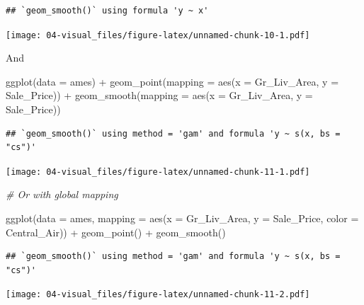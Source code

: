 \documentclass[
]{book}
\newenvironment{Shaded}{\begin{snugshade}}{\end{snugshade}}
\newcommand{\AttributeTok}[1]{\textcolor[rgb]{0.77,0.63,0.00}{#1}}
\newcommand{\CommentTok}[1]{\textcolor[rgb]{0.56,0.35,0.01}{\textit{#1}}}
\newcommand{\FunctionTok}[1]{\textcolor[rgb]{0.00,0.00,0.00}{#1}}
\newcommand{\NormalTok}[1]{#1}
\newcommand{\SpecialCharTok}[1]{\textcolor[rgb]{0.00,0.00,0.00}{#1}}
\begin{document}
\begin{verbatim}
## `geom_smooth()` using formula 'y ~ x'
\end{verbatim}

\texttt{[image: 04-visual\_files/figure-latex/unnamed-chunk-10-1.pdf]}

And

\begin{Shaded}
\begin{Highlighting}[]
\FunctionTok{ggplot}\NormalTok{(}\AttributeTok{data =}\NormalTok{ ames) }\SpecialCharTok{+} 
  \FunctionTok{geom\_point}\NormalTok{(}\AttributeTok{mapping =} \FunctionTok{aes}\NormalTok{(}\AttributeTok{x =}\NormalTok{ Gr\_Liv\_Area, }
                           \AttributeTok{y =}\NormalTok{ Sale\_Price)) }\SpecialCharTok{+}
  \FunctionTok{geom\_smooth}\NormalTok{(}\AttributeTok{mapping =} \FunctionTok{aes}\NormalTok{(}\AttributeTok{x =}\NormalTok{ Gr\_Liv\_Area, }
                           \AttributeTok{y =}\NormalTok{ Sale\_Price)) }
\end{Highlighting}
\end{Shaded}

\begin{verbatim}
## `geom_smooth()` using method = 'gam' and formula 'y ~ s(x, bs = "cs")'
\end{verbatim}

\texttt{[image: 04-visual\_files/figure-latex/unnamed-chunk-11-1.pdf]}

\begin{Shaded}
\begin{Highlighting}[]
\CommentTok{\# Or with global mapping}

\FunctionTok{ggplot}\NormalTok{(}\AttributeTok{data =}\NormalTok{ ames, }
       \AttributeTok{mapping =} \FunctionTok{aes}\NormalTok{(}\AttributeTok{x =}\NormalTok{ Gr\_Liv\_Area, }
                     \AttributeTok{y =}\NormalTok{ Sale\_Price,}
                     \AttributeTok{color =}\NormalTok{ Central\_Air)) }\SpecialCharTok{+}
  \FunctionTok{geom\_point}\NormalTok{() }\SpecialCharTok{+}
  \FunctionTok{geom\_smooth}\NormalTok{() }
\end{Highlighting}
\end{Shaded}

\begin{verbatim}
## `geom_smooth()` using method = 'gam' and formula 'y ~ s(x, bs = "cs")'
\end{verbatim}

\texttt{[image: 04-visual\_files/figure-latex/unnamed-chunk-11-2.pdf]}
\end{document}
